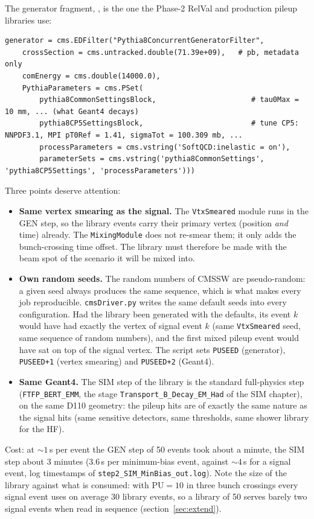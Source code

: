 \documentclass[11pt,a4paper]{article}
\newcommand{\code}[1]{\texttt{#1}}
\begin{document}
{\sloppy The generator fragment, ,
is the one the Phase-2 RelVal and production pileup libraries use:\par}
\begin{lstlisting}[style=py]
generator = cms.EDFilter("Pythia8ConcurrentGeneratorFilter",
    crossSection = cms.untracked.double(71.39e+09),   # pb, metadata only
    comEnergy = cms.double(14000.0),
    PythiaParameters = cms.PSet(
        pythia8CommonSettingsBlock,                      # tau0Max = 10 mm, ... (what Geant4 decays)
        pythia8CP5SettingsBlock,                         # tune CP5: NNPDF3.1, MPI pT0Ref = 1.41, sigmaTot = 100.309 mb, ...
        processParameters = cms.vstring('SoftQCD:inelastic = on'),
        parameterSets = cms.vstring('pythia8CommonSettings', 'pythia8CP5Settings', 'processParameters')))
\end{lstlisting}
Three points deserve attention:
\begin{itemize}
\item \textbf{Same vertex smearing as the signal.} The \code{VtxSmeared} module runs in the GEN step, so the
  library events carry their primary vertex (position \emph{and} time) already. The \code{MixingModule} does
  not re-smear them; it only adds the bunch-crossing time offset. The library must therefore be made with the
  beam spot of the scenario it will be mixed into.
\item \textbf{Own random seeds.} The random numbers of CMSSW are pseudo-random: a given seed always produces
  the same sequence, which is what makes every job reproducible. \code{cmsDriver.py} writes the same default
  seeds into every configuration.
  Had the library been generated with the defaults, its event $k$ would have had exactly the vertex of signal
  event $k$ (same \code{VtxSmeared} seed, same sequence of random numbers), and the first mixed pileup event
  would have sat on top of the signal vertex. The script sets \code{PUSEED} (generator), \code{PUSEED+1}
  (vertex smearing) and \code{PUSEED+2} (Geant4).
\item \textbf{Same Geant4.} The SIM step of the library is the standard full-physics step
  (\code{FTFP\_BERT\_EMM}, the stage \code{Transport\_B\_Decay\_EM\_Had} of the SIM chapter), on the same
  D110 geometry: the pileup hits are of exactly the same nature as the signal hits (same sensitive detectors,
  same thresholds, same shower library for the HF).
\end{itemize}
Cost: at $\sim 1$\,s per event the GEN step of 50 events took about a minute, the SIM step about 3 minutes
(3.6\,s per minimum-bias event, against $\sim 4$\,s for a signal event, log timestamps of
\code{step2\_SIM\_MinBias\_out.log}). Note the size of the library against what is consumed: with
$\mathrm{PU}=10$ in three bunch crossings every signal event uses on average 30 library events, so a library of
50 serves barely two signal events when read in sequence (section~\ref{sec:extend}).
\end{document}
